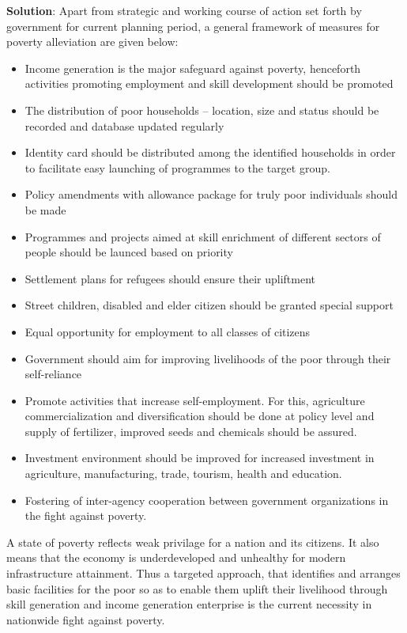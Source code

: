 \documentclass[
]{book}
\newenvironment{solution}{ {\bfseries Solution}:}{}
\begin{document}
\begin{questions}
\begin{solution}
Apart from strategic and working course of action set forth by government for current planning period, a general framework of measures for poverty alleviation are given below:

\begin{itemize}
\item Income generation is the major safeguard against poverty, henceforth activities promoting employment and skill development should be promoted
\item The distribution of poor households -- location, size and status should be recorded and database updated regularly
\item Identity card should be distributed among the identified households in order to facilitate easy launching of programmes to the target group.
\item Policy amendments with allowance package for truly poor individuals should be made
\item Programmes and projects aimed at skill enrichment of different sectors of people should be launced based on priority
\item Settlement plans for refugees should ensure their upliftment
\item Street children, disabled and elder citizen should be granted special support
\item Equal opportunity for employment to all classes of citizens
\item Government should aim for improving livelihoods of the poor through their self-reliance
\item Promote activities that increase self-employment. For this, agriculture commercialization and diversification should be done at policy level and supply of fertilizer, improved seeds and chemicals should be assured.
\item Investment environment should be improved for increased investment in agriculture, manufacturing, trade, tourism, health and education.
\item Fostering of inter-agency cooperation between government organizations in the fight against poverty.
\end{itemize}

A state of poverty reflects weak privilage for a nation and its citizens. It also means that the economy is underdeveloped and unhealthy for modern infrastructure attainment. Thus a targeted approach, that identifies and arranges basic facilities for the poor so as to enable them uplift their livelihood through skill generation and income generation enterprise is the current necessity in nationwide fight against poverty.


\end{solution}
\end{questions}
\end{document}
